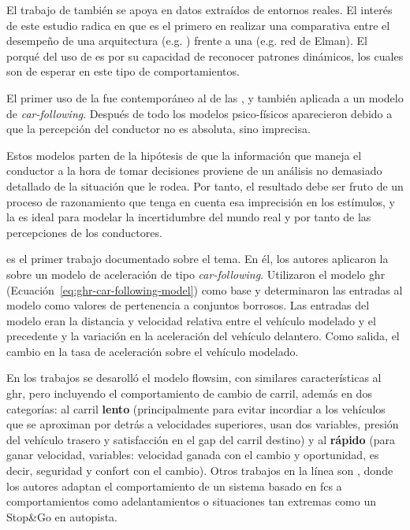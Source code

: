 {El trabajo de \cite{Simonelli2009} también se apoya en datos extraídos de entornos reales. El interés de este estudio radica en que es el primero en realizar una comparativa entre el desempeño de una arquitectura \textit{} (e.g. ) frente a una  (e.g. red de Elman). El porqué del uso de  es por su capacidad de reconocer patrones dinámicos, los cuales son de esperar en este tipo de comportamientos.

El primer uso de la  fue contemporáneo al de las , y también aplicada a un modelo de \textit{\gls{car-following}}. Después de todo los modelos psico-físicos aparecieron debido a que la percepción del conductor no es absoluta, sino imprecisa.

Estos modelos parten de la hipótesis de que la información que maneja el conductor a la hora de tomar decisiones proviene de un análisis no demasiado detallado de la situación que le rodea. Por tanto, el resultado debe ser fruto de un proceso de razonamiento que tenga en cuenta esa imprecisión en los estímulos, y la  es ideal para modelar la incertidumbre del mundo real y por tanto de las percepciones de los conductores.

\cite{Kikuchi1992} es el primer trabajo documentado sobre el tema. En él, los autores aplicaron la  sobre un modelo de aceleración de tipo \textit{\gls{car-following}}. Utilizaron el modelo \gls{ghr} (Ecuación~\ref{eq:ghr-car-following-model}) como base y determinaron las entradas al modelo como valores de pertenencia a conjuntos borrosos. Las entradas del modelo eran la distancia y velocidad relativa entre el vehículo modelado y el precedente y la variación en la aceleración del vehículo delantero. Como salida, el cambio en la tasa de aceleración sobre el vehículo modelado.

En los trabajos \cite{McDonald1997, Wu2003} se desarolló el modelo \gls{flowsim}, con similares características al \gls{ghr}, pero incluyendo el comportamiento de cambio de carril, además en dos categorías: al carril \textbf{lento} (principalmente para evitar incordiar a los vehículos que se aproximan por detrás a velocidades superiores, usan dos variables, presión del vehículo trasero y satisfacción en el gap del carril destino) y al \textbf{rápido} (para ganar velocidad, variables: velocidad ganada con el cambio y oportunidad, es decir, seguridad y confort con el cambio). Otros trabajos en la línea son \cite{naranjo2006acc, naranjo2007using}, donde los autores adaptan el comportamiento de un sistema basado en \acrshort{fcs} a comportamientos como adelantamientos o situaciones tan extremas como un Stop\&Go en autopista.

}
